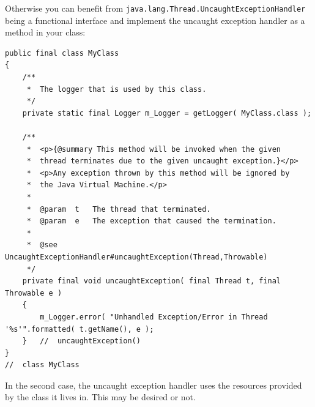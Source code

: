 \documentclass[11pt,a4paper, titlepage, parskip=half, headsepline, footsepline, cleardoublepage=current, headheight=1cm]{scrbook}
\begin{document}
Otherwise you can benefit from \lstinline|java.lang.Thread.UncaughtExceptionHandler| being a functional interface and implement the uncaught exception handler as a method in your class:
\begin{lstlisting}
public final class MyClass
{
    /**
     *  The logger that is used by this class.
     */
    private static final Logger m_Logger = getLogger( MyClass.class );
     
    /**
     *  <p>{@summary This method will be invoked when the given
     *  thread terminates due to the given uncaught exception.}</p>
     *  <p>Any exception thrown by this method will be ignored by
     *  the Java Virtual Machine.</p>
     *
     *  @param  t   The thread that terminated.
     *  @param  e   The exception that caused the termination.
     *     
     *  @see UncaughtExceptionHandler#uncaughtException(Thread,Throwable)
     */
    private final void uncaughtException( final Thread t, final Throwable e )
    {
        m_Logger.error( "Unhandled Exception/Error in Thread '%s'".formatted( t.getName(), e );
    }   //  uncaughtException()
}
//  class MyClass
\end{lstlisting}
In the second case, the uncaught exception handler uses the resources provided by the class it lives in. This may be desired or not.
\end{document}

